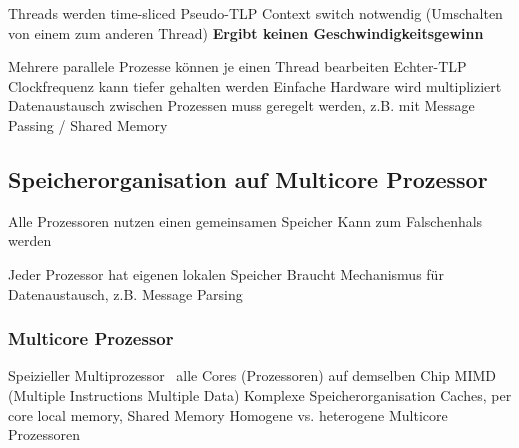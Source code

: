
\begin{outline}
    \1 Threads werden time-sliced
    \1 Pseudo-TLP
    \1 Context switch notwendig (Umschalten von einem zum anderen Thread)
    \1 \textbf{Ergibt keinen Geschwindigkeitsgewinn}
\end{outline}



\begin{outline}
    \1 Mehrere parallele Prozesse können je einen Thread bearbeiten
    \1 Echter-TLP
    \1 Clockfrequenz kann tiefer gehalten werden
    \1 Einfache Hardware wird multipliziert
    \1 Datenaustausch zwischen Prozessen muss geregelt werden, z.B. mit Message Passing / Shared Memory
\end{outline}


\subsection{Speicherorganisation auf Multicore Prozessor}

\begin{minipage}[t]{0.45\columnwidth}
    \raggedright

    \begin{outline}
        \1 Alle Prozessoren nutzen einen gemeinsamen Speicher
            \2 Kann zum Falschenhals werden
    \end{outline}
\end{minipage}
\hfill
\begin{minipage}[t]{0.53\columnwidth}
    \raggedright

    \begin{outline}
        \1 Jeder Prozessor hat eigenen lokalen Speicher
            \2 Braucht Mechanismus für Datenaustausch, z.B. Message Parsing
    \end{outline}
\end{minipage}


\subsubsection{Multicore Prozessor}

\begin{outline}
    \1 Speizieller Multiprozessor \textrightarrow\ alle Cores (Prozessoren) auf demselben Chip
    \1 MIMD (Multiple Instructions Multiple Data)
    \1 Komplexe Speicherorganisation
        \2 Caches, per core local memory, Shared Memory
    \1 Homogene vs. heterogene Multicore Prozessoren
\end{outline}


